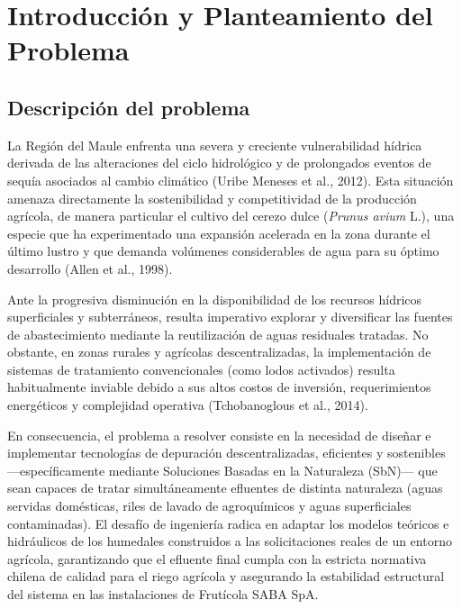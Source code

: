 \documentclass[12pt, letterpaper]{report}
\begin{document}
\newpage

\pagestyle{fancy}


\chapter{Introducción y Planteamiento del Problema}

\section{Descripción del problema}

La Región del Maule enfrenta una severa y creciente vulnerabilidad hídrica derivada de las alteraciones del ciclo hidrológico y de prolongados eventos de sequía asociados al cambio climático (Uribe Meneses et al., 2012). Esta situación amenaza directamente la sostenibilidad y competitividad de la producción agrícola, de manera particular el cultivo del cerezo dulce (\textit{Prunus avium} L.), una especie que ha experimentado una expansión acelerada en la zona durante el último lustro y que demanda volúmenes considerables de agua para su óptimo desarrollo (Allen et al., 1998). 

Ante la progresiva disminución en la disponibilidad de los recursos hídricos superficiales y subterráneos, resulta imperativo explorar y diversificar las fuentes de abastecimiento mediante la reutilización de aguas residuales tratadas. No obstante, en zonas rurales y agrícolas descentralizadas, la implementación de sistemas de tratamiento convencionales (como lodos activados) resulta habitualmente inviable debido a sus altos costos de inversión, requerimientos energéticos y complejidad operativa (Tchobanoglous et al., 2014).

En consecuencia, el problema a resolver consiste en la necesidad de diseñar e implementar tecnologías de depuración descentralizadas, eficientes y sostenibles ---específicamente mediante Soluciones Basadas en la Naturaleza (SbN)--- que sean capaces de tratar simultáneamente efluentes de distinta naturaleza (aguas servidas domésticas, riles de lavado de agroquímicos y aguas superficiales contaminadas). El desafío de ingeniería radica en adaptar los modelos teóricos e hidráulicos de los humedales construidos a las solicitaciones reales de un entorno agrícola, garantizando que el efluente final cumpla con la estricta normativa chilena de calidad para el riego agrícola y asegurando la estabilidad estructural del sistema en las instalaciones de Frutícola SABA SpA.
\end{document}
